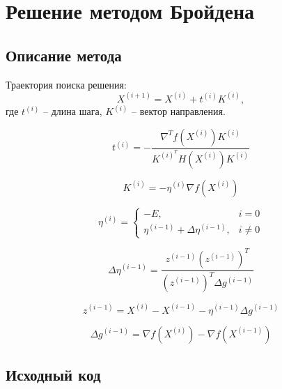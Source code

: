\section{Решение методом Бройдена}

\subsection{Описание метода}

Траектория поиска решения:
\begin{equation*}
X^{(i+1)}  = X^{(i)} + t^{(i)} K^{(i)},
\end{equation*}
где $t^{(i)}$ -- длина шага, $K^{(i)}$ -- вектор направления.

\begin{equation*}
t^{(i)} = -\dfrac{\nabla^T f\left(X^{(i)}\right) K^{(i)}}{K^{(i)^T} H\left(X^{(i)}\right) K^{(i)}}
\end{equation*}

\begin{equation*}
K^{(i)} = -\eta^{(i)} \nabla f\left(X^{(i)}\right)
\end{equation*}

\begin{equation*}
\eta^{(i)} = 
\begin{cases}
-E, &i = 0\\
\eta^{(i-1)} + \Delta \eta^{(i-1)}, &i \neq 0
\end{cases}
\end{equation*}

\begin{equation*}
\Delta \eta^{(i-1)} = \dfrac{z^{(i-1)} \left(z^{(i-1)}\right)^T}{\left(z^{(i-1)}\right)^T \Delta g^{(i-1)}}
\end{equation*}

\begin{equation*}
z^{(i-1)} = X^{(i)} - X^{(i-1)} - \eta^{(i-1)} \Delta g^{(i-1)}
\end{equation*}

\begin{equation*}
\Delta g^{(i-1)} = \nabla f\left(X^{(i)}\right) - \nabla f\left(X^{(i-1)}\right)
\end{equation*}

\subsection{Исходный код}



